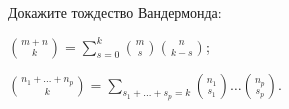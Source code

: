 Докажите тождество Вандермонда:
\begin{enumcyr}
    \item $\displaystyle \binom{m + n}{k} = \sum_{s = 0}^k \binom{m}{s} \binom{n}{k - s}$;
    \item $\displaystyle \binom{n_1 + \dots + n_p}{k} = \sum_{s_1 + \dots + s_p = k} \binom{n_1}{s_1}
        \dots \binom{n_p}{s_p}$.
\end{enumcyr}